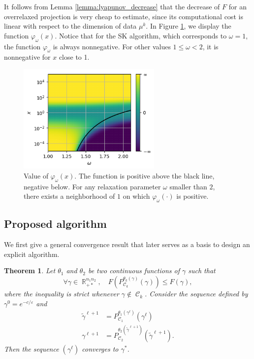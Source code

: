 \documentclass{article} %
\DeclareMathOperator{\IR}{\mathbb{R}}
\DeclareMathOperator{\Ccal}{\mathcal{C}}
\renewcommand{\epsilon}{\varepsilon}
\theoremstyle{plain}
\newtheorem{theorem}{Theorem}
\theoremstyle{definition}
\theoremstyle{remark}
\begin{document}

It follows from Lemma \ref{lemma:lyapunov_decrease} that the decrease of $F$ for an overrelaxed projection is very cheap to estimate, since its computational cost is linear with respect to the dimension of data $\mu^k$. In Figure \ref{phi_omega}, we display the function  $\varphi_\omega(x)$. Notice that for the SK algorithm, which corresponds to $\omega=1$, the function $\varphi_\omega$ is always nonnegative. For other values $1\le\omega<2$, it is nonnegative for $x$ close to 1.

\begin{figure}[ht!]
\begin{center}
\includegraphics[width=7cm]{images/cvgce_zone}
\caption{\label{phi_omega} Value of $\varphi_\omega(x)$. The function is positive above the black line, negative below. For any relaxation parameter $\omega$ smaller than $2$, there exists a neighborhood of $1$ on which $\varphi_\omega(\cdot)$ is positive.}
\end{center}
\end{figure}

\subsection{Proposed algorithm}
We first give a general convergence result that later serves as a basis to design an explicit algorithm.
\begin{theorem}\label{thm:algo}
Let $\theta_1$ and $\theta_2$ be two continuous functions of $\gamma$ such that
	\begin{equation}\label{eq:cond_theta_k}
	\forall \gamma \in \IR_{+*}^{n_1 n_2},\quad
	F(P_{\Ccal_k}^{\theta_k(\gamma)}(\gamma)) \le F(\gamma) ,
	\end{equation}
	where the inequality is strict whenever $\gamma \notin \Ccal_k$.
	Consider the sequence defined by $\gamma^0 = e^{-c/\epsilon}$ and
	\begin{align*}
	\tilde{\gamma}^{\ell+1} &= P_{\Ccal_1}^{\theta_1(\gamma^{\ell})}(\gamma^{\ell}) \\
	\gamma^{\ell+1} &= P_{\Ccal_2}^{\theta_2(\tilde{\gamma}^{\ell+1})}(\tilde{\gamma}^{\ell+1}).
	\end{align*}
	Then the sequence $(\gamma^{\ell})$ converges to $\gamma^*$.
\end{theorem}
\end{document}
